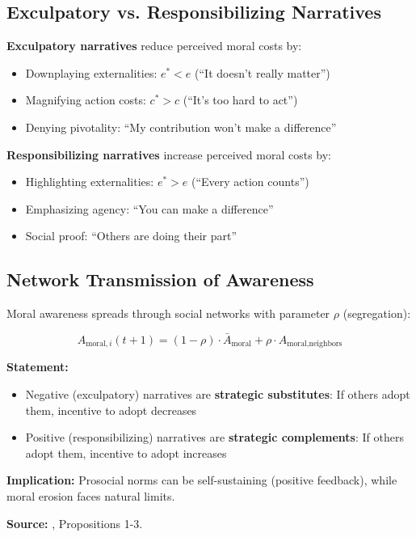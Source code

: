 \subsection{Exculpatory vs. Responsibilizing Narratives}

\begin{definition}
\textbf{Exculpatory narratives} reduce perceived moral costs by:
\begin{itemize}[nosep]
\item Downplaying externalities: $e^* < e$ (``It doesn't really matter'')
\item Magnifying action costs: $c^* > c$ (``It's too hard to act'')
\item Denying pivotality: ``My contribution won't make a difference''
\end{itemize}

\textbf{Responsibilizing narratives} increase perceived moral costs by:
\begin{itemize}[nosep]
\item Highlighting externalities: $e^* > e$ (``Every action counts'')
\item Emphasizing agency: ``You can make a difference''
\item Social proof: ``Others are doing their part''
\end{itemize}
\end{definition}

\subsection{Network Transmission of Awareness}
\label{subsec:aware-network}

Moral awareness spreads through social networks with parameter $\rho$ (segregation):

\begin{equation}
A_{\text{moral},i}(t+1) = (1-\rho) \cdot \bar{A}_{\text{moral}} + \rho \cdot A_{\text{moral},\text{neighbors}}
\end{equation}

\begin{tcolorbox}[colback=gray!5!white, colframe=gray!75!black,
    title=Axiom AWX-A5: Narrative Transmission]
\textbf{Statement:}
\begin{itemize}[nosep]
\item Negative (exculpatory) narratives are \textbf{strategic substitutes}: If others adopt them, incentive to adopt decreases
\item Positive (responsibilizing) narratives are \textbf{strategic complements}: If others adopt them, incentive to adopt increases
\end{itemize}

\textbf{Implication:} Prosocial norms can be self-sustaining (positive feedback), while moral erosion faces natural limits.

\textbf{Source:} \citet{benabou2018narratives}, Propositions 1-3.
\end{tcolorbox}

